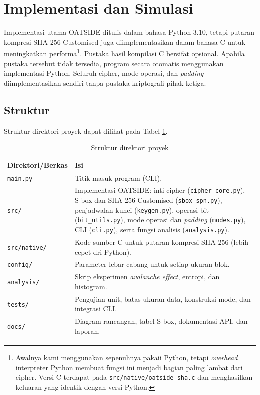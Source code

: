 \section{Implementasi dan Simulasi}
Implementasi utama OATSIDE ditulis dalam bahasa Python 3.10, tetapi putaran kompresi SHA-256 Customised juga diimplementasikan dalam bahasa C untuk meningkatkan performa\footnote{Awalnya kami menggunakan sepenuhnya pakaii Python, tetapi \textit{overhead} interpreter Python membuat fungsi ini menjadi bagian paling lambat dari cipher. Versi C terdapat pada \texttt{src/native/oatside\_sha.c} dan menghasilkan keluaran yang identik dengan versi Python.}. Pustaka hasil kompilasi C bersifat opsional. Apabila pustaka tersebut tidak tersedia, program secara otomatis menggunakan implementasi Python. Seluruh cipher, mode operasi, dan \textit{padding} diimplementasikan sendiri tanpa pustaka kriptografi pihak ketiga.

\subsection{Struktur}
Struktur direktori proyek dapat dilihat pada Tabel \ref{tab:struktur_proyek}.

\begin{table}[H]
    \centering
    \small
    \caption{Struktur direktori proyek}
    \label{tab:struktur_proyek}
    \begin{tabularx}{\textwidth}{@{}l >{\raggedright\arraybackslash}X@{}}
        \toprule
        \textbf{Direktori/Berkas} & \textbf{Isi} \\
        \midrule
        \texttt{main.py} & Titik masuk program (CLI). \\
        \texttt{src/} & Implementasi OATSIDE: inti cipher (\texttt{cipher\_core.py}), S-box dan SHA-256 Customised (\texttt{sbox\_spn.py}), penjadwalan kunci (\texttt{keygen.py}), operasi bit (\texttt{bit\_utils.py}), mode operasi dan \textit{padding} (\texttt{modes.py}), CLI (\texttt{cli.py}), serta fungsi analisis (\texttt{analysis.py}). \\
        \texttt{src/native/} & Kode sumber C untuk putaran kompresi SHA-256 (lebih cepet dri Python). \\
        \texttt{config/} & Parameter lebar cabang untuk setiap ukuran blok. \\
        \texttt{analysis/} & Skrip eksperimen \textit{avalanche effect}, entropi, dan histogram. \\
        \texttt{tests/} & Pengujian unit, batas ukuran data, konstruksi mode, dan integrasi CLI. \\
        \texttt{docs/} & Diagram rancangan, tabel S-box, dokumentasi API, dan laporan. \\
        \bottomrule
    \end{tabularx}
\end{table}

